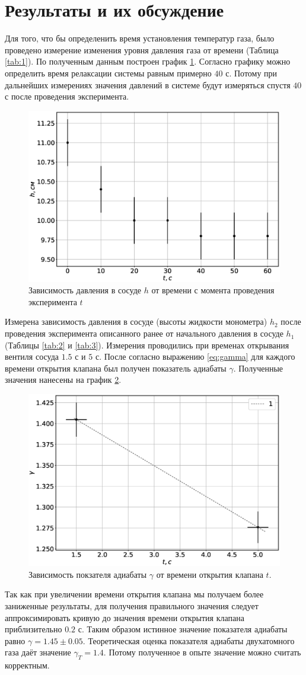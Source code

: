 \documentclass[12pt]{article}
\begin{document}
\section{Результаты и их обсуждение}
Для того, что бы определенить время установления температур газа, было проведено измерение изменения 
уровня давления газа от времени (Таблица \ref{tab:1}). По полученным данным построен график \ref{fig:1}. 
Согласно графику можно определить время релаксации системы равным примерно $40$ с. Потому при дальнейших 
измерениях значения давлений в системе будут измеряться спустя $40$ с после проведения эксперимента.    
\begin{figure}[H]
    \centering
    \includegraphics[width=0.7\linewidth]{ht.eps}
    \caption{Зависимость давления в сосуде $h$ от времени с момента проведения эксперимента $t$}
    \label{fig:1}
\end{figure}
Измерена зависимость давления в сосуде (высоты жидкости монометра) $h_2$ после проведения 
эксперимента описанного ранее от начального давления в сосуде $h_1$ (Таблицы \ref{tab:2} и \ref{tab:3}). 
Измерения проводились при временах открывания вентиля сосуда $1.5$ с и $5$ с. После согласно выражению 
\ref{eq:gamma} для каждого времени открытия клапана был получен показатель адиабаты $\gamma$. Полученные 
значения нанесены на график \ref{fig:2}. 
\begin{figure}[H]
    \centering
    \includegraphics[width=0.7\linewidth]{gammat.eps}
    \caption{Зависимость покзателя адиабаты $\gamma$ от времени открытия клапана $t$.}
    \label{fig:2}
\end{figure}
Так как при увеличении времени открытия клапана мы получаем более заниженные результаты, для получения правильного 
значения следует аппроксимировать кривую до значения времени открытия клапана приблизительно $0.2$ с. 
Таким образом истинное значение показателя адиабаты равно $\gamma = 1.45 \pm 0.05$. Теоретическая
оценка показателя адиабаты двухатомного газа даёт значение $\gamma_T = 1.4$. Потому полученное в опыте 
значение можно считать корректным.  
\end{document}
